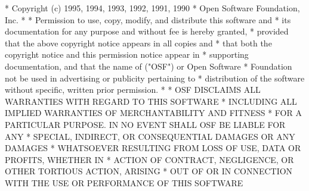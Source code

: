 \begin{copyrightEnv}
 * Copyright (c) 1995, 1994, 1993, 1992, 1991, 1990
 * Open Software Foundation, Inc.
 *
 * Permission to use, copy, modify, and distribute this software and
 * its documentation for any purpose and without fee is hereby granted,
 * provided that the above copyright notice appears in all copies and
 * that both the copyright notice and this permission notice appear in
 * supporting documentation, and that the name of ("OSF") or Open Software
 * Foundation not be used in advertising or publicity pertaining to
 * distribution of the software without specific, written prior permission.
 *
 * OSF DISCLAIMS ALL WARRANTIES WITH REGARD TO THIS SOFTWARE
 * INCLUDING ALL IMPLIED WARRANTIES OF MERCHANTABILITY AND FITNESS
 * FOR A PARTICULAR PURPOSE. IN NO EVENT SHALL OSF BE LIABLE FOR ANY
 * SPECIAL, INDIRECT, OR CONSEQUENTIAL DAMAGES OR ANY DAMAGES
 * WHATSOEVER RESULTING FROM LOSS OF USE, DATA OR PROFITS, WHETHER IN
 * ACTION OF CONTRACT, NEGLIGENCE, OR OTHER TORTIOUS ACTION, ARISING
 * OUT OF OR IN CONNECTION WITH THE USE OR PERFORMANCE OF THIS SOFTWARE
\end{copyrightEnv}

